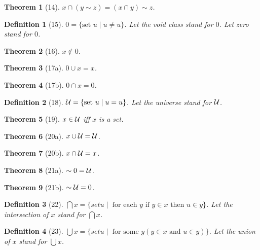 \documentclass{scrartcl}
\newtheorem*{theorem}{Theorem}
\newtheorem*{definition}{Definition}
\begin{document}
\begin{theorem}[14] $x \cap (y \sim z) = (x \cap y) \sim z$.
\end{theorem}

\begin{definition}[15] $0 = \{\text{set } u \mid u \neq u\}$.
Let the \emph{void class} stand for $0$.
Let \emph{zero} stand for $0$.
\end{definition}

\begin{theorem}[16] $x \notin 0$.
\end{theorem}

\begin{theorem}[17a] $0 \cup x = x$.
\end{theorem}

\begin{theorem}[17b] $0 \cap x = 0$.
\end{theorem}

\begin{definition}[18] ${\cal U} = \{\text{set } u \mid u = u\}$.
Let the \emph{universe} stand for ${\cal U}$.
\end{definition}

\begin{theorem}[19] $x \in {\cal U}$ iff $x$ is a set.
\end{theorem}

\begin{theorem}[20a] $x \cup {\cal U} = {\cal U}$.
\end{theorem}

\begin{theorem}[20b] $x \cap {\cal U} = x$.
\end{theorem}

\begin{theorem}[21a] $\sim 0 = {\cal U}$.
\end{theorem}

\begin{theorem}[21b] $\sim {\cal U} = 0$.
\end{theorem}

\begin{definition}[22] $\bigcap x = 
\{set u \mid \text{ for each } y \text{ if } y \in x \text{ then } u \in y\}$.
Let the \emph{intersection} of $x$ stand for $\bigcap x$.
\end{definition}

\begin{definition}[23] $\bigcup x = 
\{set u \mid \text{ for some } y (y \in x \text{ and } u \in y)\}$.
Let the \emph{union} of $x$ stand for $\bigcup x$.
\end{definition}
\end{document}
